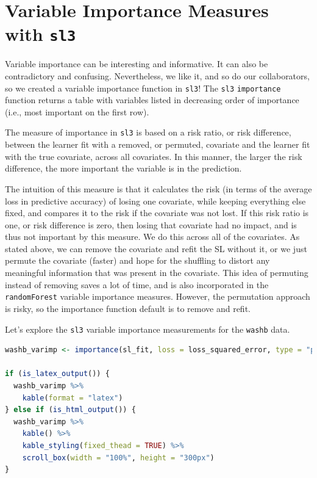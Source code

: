 \documentclass[
  12pt, krantz2,
]{book}
\newcommand{\passthrough}[1]{#1}
\theoremstyle{definition}
\theoremstyle{definition}
\theoremstyle{definition}
\newcommand{\1}{\mathbbm{1}}
\begin{document}
\hypertarget{variable-importance-measures-with-sl3}{%
\section*{\texorpdfstring{Variable Importance Measures with \texttt{sl3}}{Variable Importance Measures with sl3}}\label{variable-importance-measures-with-sl3}}


Variable importance can be interesting and informative. It can also be
contradictory and confusing. Nevertheless, we like it, and so do our
collaborators, so we created a variable importance function in \passthrough{\lstinline!sl3!}! The \passthrough{\lstinline!sl3!}
\passthrough{\lstinline!importance!} function returns a table with variables listed in decreasing order
of importance (i.e., most important on the first row).

The measure of importance in \passthrough{\lstinline!sl3!} is based on a risk ratio, or risk difference,
between the learner fit with a removed, or permuted, covariate and the learner
fit with the true covariate, across all covariates. In this manner, the larger
the risk difference, the more important the variable is in the prediction.

The intuition of this measure is that it calculates the risk (in terms of the
average loss in predictive accuracy) of losing one covariate, while keeping
everything else fixed, and compares it to the risk if the covariate was not
lost. If this risk ratio is one, or risk difference is zero, then losing that
covariate had no impact, and is thus not important by this measure. We do this
across all of the covariates. As stated above, we can remove the covariate and
refit the SL without it, or we just permute the covariate (faster)
and hope for the shuffling to distort any meaningful information that was
present in the covariate. This idea of permuting instead of removing saves a lot
of time, and is also incorporated in the \passthrough{\lstinline!randomForest!} variable importance
measures. However, the permutation approach is risky, so the importance function
default is to remove and refit.

Let's explore the \passthrough{\lstinline!sl3!} variable importance measurements for the \passthrough{\lstinline!washb!} data.

\begin{lstlisting}[language=R]
washb_varimp <- importance(sl_fit, loss = loss_squared_error, type = "permute")

if (is_latex_output()) {
  washb_varimp %>%
    kable(format = "latex")
} else if (is_html_output()) {
  washb_varimp %>%
    kable() %>%
    kable_styling(fixed_thead = TRUE) %>%
    scroll_box(width = "100%", height = "300px")
}
\end{lstlisting}
\end{document}
